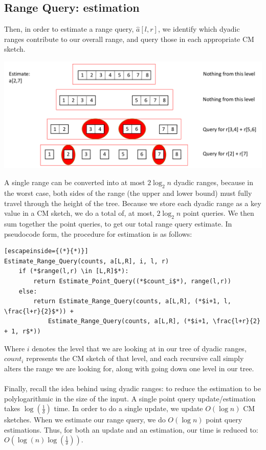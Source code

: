 \documentclass[11pt]{article}
\begin{document}
\subsection{Range Query: estimation}
Then, in order to estimate a range query, $\hat a[l,r]$, we identify which dyadic ranges contribute to our overall range, and query those in each appropriate CM sketch.
\begin{center}\includegraphics[scale=0.3]{range_estimate.png}\end{center}
A single range can be converted into at most $2\log_2n$ dyadic ranges, because in the worst case, both sides of the range (the upper and lower bound)  must fully travel through the height of the tree. Because we store each dyadic range as a key value in a CM sketch, we do a total of, at most, $2\log_2n$ point queries. We then sum together the point queries, to get our total range query estimate. In pseudocode form, the procedure for estimation is as follows:
\begin{lstlisting}[escapeinside={(*}{*)}]
Estimate_Range_Query(counts, a[L,R], i, l, r) 
    if (*$range(l,r) \in [L,R]$*):
        return Estimate_Point_Query((*$count_i$*), range(l,r))
    else:
        return Estimate_Range_Query(counts, a[L,R], (*$i+1, l, \frac{l+r}{2}$*)) +
            Estimate_Range_Query(counts, a[L,R], (*$i+1, \frac{l+r}{2} + 1, r$*))
\end{lstlisting}
Where $i$ denotes the level that we are looking at in our tree of dyadic ranges, $count_i$ represents the CM sketch of that level, and each recursive call simply alters the range we are looking for, along with going down one level in our tree.\\\\
Finally, recall the idea behind using dyadic ranges: to reduce the estimation to be polylogarithmic in the size of the input. A single point query update/estimation takes $\log(\frac{1}{\delta})$ time. In order to do a single update, we update $O(\log n)$ CM sketches. When we estimate our range query, we do $O(\log n)$ point query estimations. Thus, for both an update and an estimation, our time is reduced to: $O(\log(n)\log(\frac{1}{\delta}))$.
\end{document}
